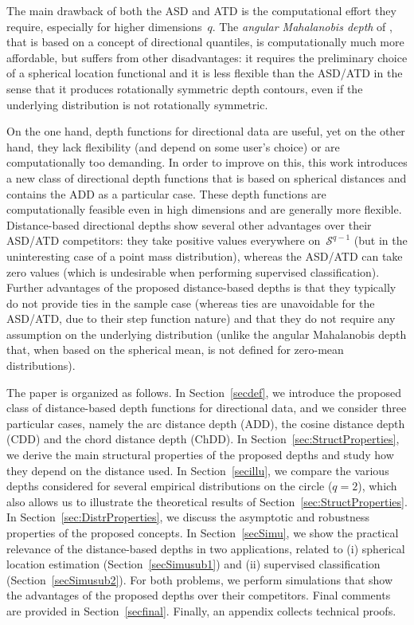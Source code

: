 \documentclass[usenames,dvipsnames]{article}
\begin{document}
The main drawback of both the ASD and ATD is the computational effort they require, especially for higher dimensions~$q$. The \emph{angular Mahalanobis depth} of \cite{Leyetal2014}, that is based on a concept of directional quantiles, is computationally much more affordable, but suffers from other disadvantages: it requires the preliminary choice of a spherical location functional and it is less flexible than the ASD/ATD in the sense that it produces rotationally symmetric depth contours, even if the underlying distribution is not rotationally symmetric.

On the one hand, depth functions for directional data are useful, yet on the other hand, they lack flexibility (and depend on some user's choice) or are computationally too demanding. In order to improve on this, this work introduces a new class of directional depth functions that is based on spherical distances and contains the ADD as a particular case. These depth functions are computationally feasible even in high dimensions and are generally more flexible. Distance-based directional depths show several other advantages over their ASD/ATD competitors: they take positive values everywhere on~$\mathcal{S}^{q-1}$ (but in the uninteresting case of a point mass distribution), whereas the ASD/ATD can take zero values (which is undesirable when performing supervised classification). Further advantages of the proposed distance-based depths is that they typically do not provide ties in the sample case (whereas ties are unavoidable for the ASD/ATD, due to their step function nature) and that they do not require any assumption on the underlying distribution (unlike the angular Mahalanobis depth that, when based on the spherical mean, is not defined for zero-mean distributions).

The paper is organized as follows. In Section~\ref{secdef}, we introduce the proposed class of distance-based depth functions for directional data, and we consider three particular cases, namely the arc distance depth (ADD), the cosine distance depth (CDD) and the chord distance depth (ChDD). In Section~\ref{sec:StructProperties}, we derive the main structural properties of the proposed depths and study how they depend on the distance used. In Section~\ref{secillu}, we compare the various depths considered for several empirical distributions on the circle ($q=2$), which also allows us to illustrate the theoretical results of Section~\ref{sec:StructProperties}. In Section~\ref{sec:DistrProperties}, we discuss the asymptotic and robustness properties of the proposed concepts. In Section~\ref{secSimu}, we show the practical relevance of the distance-based depths in two applications, related to (i) spherical location estimation (Section~\ref{secSimusub1}) and (ii) supervised classification (Section~\ref{secSimusub2}). For both problems, we perform simulations that show the advantages of the proposed depths over their competitors. Final comments are provided in Section~\ref{secfinal}. Finally, an appendix collects technical proofs. 
\end{document}
